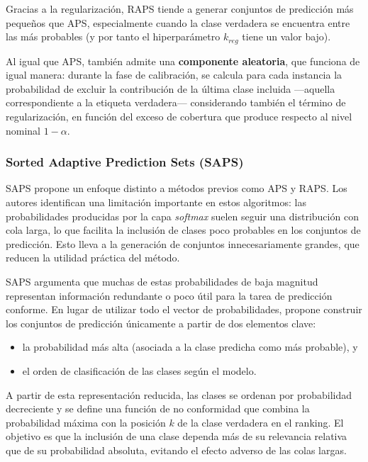 Gracias a la regularización, \acrshort{RAPS} tiende a generar conjuntos de predicción más pequeños que \acrshort{APS}, especialmente cuando la clase verdadera se encuentra entre las más probables (y por tanto el hiperparámetro $k_{reg}$ tiene un valor bajo).

Al igual que \acrshort{APS}, también admite una \textbf{componente aleatoria}, que funciona de igual manera: durante la fase de calibración, se calcula para cada instancia la probabilidad de excluir la contribución de la última clase incluida ---aquella correspondiente a la etiqueta verdadera--- considerando también el término de regularización, en función del exceso de cobertura que produce respecto al nivel nominal $1-\alpha$.


\subsubsection{Sorted Adaptive Prediction Sets (SAPS)}

\acrshort{SAPS} \cite{huang2023conformal} propone un enfoque distinto a métodos previos como \acrshort{APS} y \acrshort{RAPS}. Los autores identifican una limitación importante en estos algoritmos: las probabilidades producidas por la capa \textit{softmax} suelen seguir una distribución con cola larga, lo que facilita la inclusión de clases poco probables en los conjuntos de predicción. Esto lleva a la generación de conjuntos innecesariamente grandes, que reducen la utilidad práctica del método.

\acrshort{SAPS} argumenta que muchas de estas probabilidades de baja magnitud representan información redundante o poco útil para la tarea de predicción conforme. En lugar de utilizar todo el vector de probabilidades, propone construir los conjuntos de predicción únicamente a partir de dos elementos clave: 
\begin{itemize}
    \item la probabilidad más alta (asociada a la clase predicha como más probable), y
    \item el orden de clasificación de las clases según el modelo.
\end{itemize}

A partir de esta representación reducida, las clases se ordenan por probabilidad decreciente y se define una función de no conformidad que combina la probabilidad máxima con la posición $k$ de la clase verdadera en el ranking. El objetivo es que la inclusión de una clase dependa más de su relevancia relativa que de su probabilidad absoluta, evitando el efecto adverso de las colas largas.

